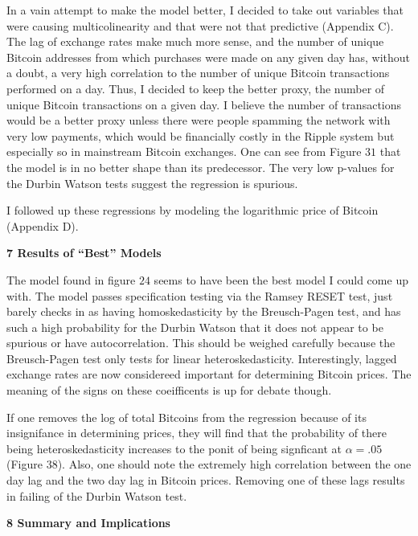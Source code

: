 \documentclass{article}[10 pt]
\newcommand{\vs}{\vspace{0.1in}}
\begin{document}
\vs

In a vain attempt to make the model better, I decided to take out variables
that were causing multicolinearity and that were not that predictive
(Appendix C). The lag of exchange rates make much more sense, and the
number of unique Bitcoin addresses from which purchases were made on any
given day has, without a doubt, a very high correlation to the number of
unique Bitcoin transactions performed on a day. Thus, I decided to keep the
better proxy, the number of unique Bitcoin transactions on a given day. I
believe the number of transactions would be a better proxy unless there
were people spamming the network with very low payments, which would be
financially costly in the Ripple system but especially so in mainstream
Bitcoin exchanges. One can see from Figure $31$ that the model is in no
better shape than its predecessor. The very low p-values for the Durbin
Watson tests suggest the regression is spurious.

\vs

I followed up these regressions by modeling the logarithmic price of
 Bitcoin (Appendix D). 

\vs

\textbf{7 Results of “Best” Models}

\vs

The model found in figure $24$ seems to have been the best model I could
come up with. The model passes specification testing via the Ramsey RESET
test, just barely checks in as having homoskedasticity by the Breusch-Pagen
test, and has such a high probability for the Durbin Watson that it does
not appear to be spurious or have autocorrelation. This should be weighed
carefully because the Breusch-Pagen test only tests for linear
heteroskedasticity. Interestingly, lagged exchange rates are now
considereed important for determining Bitcoin prices. The meaning of the
signs on these coeifficents is up for debate though. 

\vs

If one removes the log of total Bitcoins from the regression because of its
insignifance in determining prices, they will find that the probability of
there being heteroskedasticity increases to the ponit of being signficant at
$\alpha=.05$ (Figure $38$). Also, one should note the extremely high
correlation between the one day lag and the two day lag in Bitcoin prices.
Removing one of these lags results in failing of the Durbin Watson test.   

\vs

\textbf{8 Summary and Implications}
\end{document}
